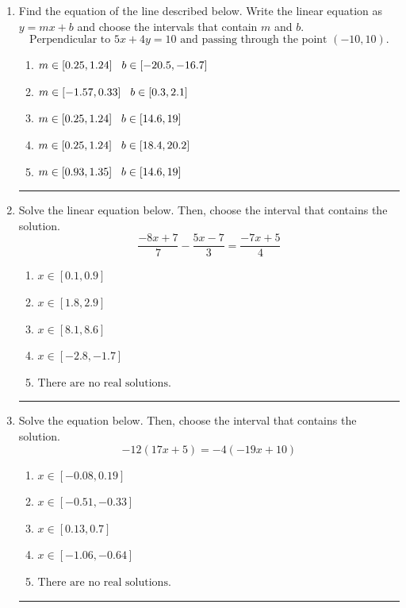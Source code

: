 \documentclass[14pt]{extbook}
\newcommand{\litem}[1]{\item#1\hspace*{-1cm}\rule{\textwidth}{0.4pt}}
\begin{document}
\begin{enumerate}
{\begin{enumerate}[label=\Alph*.]
\end{enumerate} }
\litem{
Find the equation of the line described below. Write the linear equation as $ y=mx+b $ and choose the intervals that contain $m$ and $b$.\[ \text{Perpendicular to } 5 x + 4 y = 10 \text{ and passing through the point } (-10, 10). \]\begin{enumerate}[label=\Alph*.]
\item \( m \in [0.25, 1.24] \hspace*{3mm} b \in [-20.5, -16.7] \)
\item \( m \in [-1.57, 0.33] \hspace*{3mm} b \in [0.3, 2.1] \)
\item \( m \in [0.25, 1.24] \hspace*{3mm} b \in [14.6, 19] \)
\item \( m \in [0.25, 1.24] \hspace*{3mm} b \in [18.4, 20.2] \)
\item \( m \in [0.93, 1.35] \hspace*{3mm} b \in [14.6, 19] \)

\end{enumerate} }
\litem{
Solve the linear equation below. Then, choose the interval that contains the solution.\[ \frac{-8x + 7}{7} - \frac{5x -7}{3} = \frac{-7x + 5}{4} \]\begin{enumerate}[label=\Alph*.]
\item \( x \in [0.1, 0.9] \)
\item \( x \in [1.8, 2.9] \)
\item \( x \in [8.1, 8.6] \)
\item \( x \in [-2.8, -1.7] \)
\item \( \text{There are no real solutions.} \)

\end{enumerate} }
\litem{
Solve the equation below. Then, choose the interval that contains the solution.\[ -12(17x + 5) = -4(-19x + 10) \]\begin{enumerate}[label=\Alph*.]
\item \( x \in [-0.08, 0.19] \)
\item \( x \in [-0.51, -0.33] \)
\item \( x \in [0.13, 0.7] \)
\item \( x \in [-1.06, -0.64] \)
\item \( \text{There are no real solutions.} \)

\end{enumerate} }
\end{enumerate}
\end{document}
